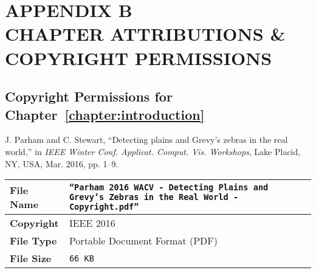 
\setcounter{table}{0}
\renewcommand{\thetable}{B. \arabic{table}}

\setcounter{figure}{0}
\renewcommand{\thefigure}{B. \arabic{figure}}

\setcounter{section}{0}
\renewcommand{\thesection}{B.\arabic{section}}

\chapter*{APPENDIX B\\CHAPTER ATTRIBUTIONS \& COPYRIGHT PERMISSIONS}

\section{Copyright Permissions for Chapter~\ref{chapter:introduction}}

\begin{tcolorbox}
    J. Parham and C. Stewart, ``Detecting plains and Grevy’s zebras in the real world,'' in \textit{IEEE Winter Conf. Applicat. Comput. Vis. Workshops}, Lake Placid, NY, USA, Mar. 2016, pp. 1–9.
\end{tcolorbox}

\begin{table*}[!ht]
    \begin{center}
        \begin{tabular}{| l | p{13.5cm} |}
            \hline
            \textbf{File Name} & \texttt{``Parham 2016 WACV - Detecting Plains and Grevy's Zebras in the Real World - Copyright.pdf''} \\
            \hline
            \textbf{Copyright} & IEEE 2016                                                                                             \\
            \hline
            \textbf{File Type} & Portable Document Format (PDF)                                                                        \\
            \hline
            \textbf{File Size} & \texttt{66 KB}                                                                                        \\
            \hline
        \end{tabular}
    \end{center}
\end{table*}

